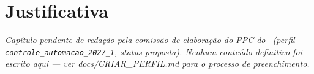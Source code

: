 \chapter{Justificativa}

\textit{Capítulo pendente de redação pela comissão de elaboração do PPC do
\ppccurso\ (perfil \texttt{controle\_automacao\_2027\_1}, status
proposta). Nenhum conteúdo definitivo foi escrito aqui — ver
docs/CRIAR\_PERFIL.md para o processo de preenchimento.}
